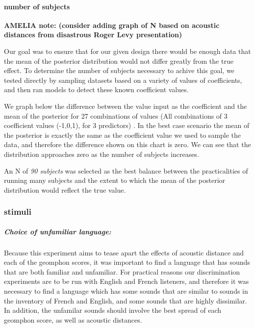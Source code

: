 \documentclass[]{article}
\let\oldparagraph\paragraph
\renewcommand{\paragraph}[1]{\oldparagraph{#1}\mbox{}}
\let\oldsubparagraph\subparagraph
\renewcommand{\subparagraph}[1]{\oldsubparagraph{#1}\mbox{}}
\begin{document}
\hypertarget{number-of-subjects}{%
\paragraph{number of subjects}\label{number-of-subjects}}

\textbf{AMELIA note: (consider adding graph of N based on acoustic
distances from disastrous Roger Levy presentation)}

Our goal was to ensure that for our given design there would be enough
data that the mean of the posterior distribution would not differ
greatly from the true effect. To determine the number of subjects
necessary to achive this goal, we tested directly by sampling datasets
based on a variety of values of coefficients, and then ran models to
detect these known coefficient values.

We graph below the difference between the value input as the coefficient
and the mean of the posterior for 27 combinations of values (All
combinations of 3 coefficient values (-1,0,1), for 3 predictors) . In
the best case scenario the mean of the posterior is exactly the same as
the coefficient value we used to sample the data, and therefore the
difference shown on this chart is zero. We can see that the distribution
approaches zero as the number of subjects increases.

An N of \emph{90 subjects} was selected as the best balance between the
practicalities of running many subjects and the extent to which the mean
of the posterior distribution would reflect the true value.

\hypertarget{stimuli}{%
\subsubsection{stimuli}\label{stimuli}}

\hypertarget{choice-of-unfamiliar-language}{%
\subparagraph{Choice of unfamiliar
language:}\label{choice-of-unfamiliar-language}}

Because this experiment aims to tease apart the effects of acoustic
distance and each of the geomphon scores, it was important to find a
language that has sounds that are both familiar and unfamiliar. For
practical reasons our discrimination experiments are to be run with
English and French listeners, and therefore it was necessary to find a
language which has some sounds that are similar to sounds in the
inventory of French and English, and some sounds that are highly
dissimilar. In addition, the unfamilar sounds should involve the best
spread of each geomphon score, as well as acoustic distances.
\end{document}
